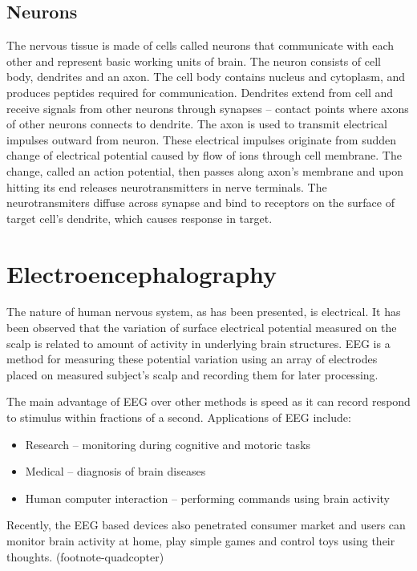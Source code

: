 \subsection{Neurons}
The nervous tissue is made of cells called neurons that communicate with each
other and represent basic working units of brain. The neuron consists of cell
body, dendrites and an axon. The cell body contains nucleus and cytoplasm, and
produces peptides required for communication. Dendrites extend from cell and
receive signals from other neurons through synapses -- contact points where
axons of other neurons connects to dendrite. The axon is used to transmit
electrical impulses outward from neuron. These electrical impulses originate
from sudden change of electrical potential caused by flow of ions through cell
membrane. The change, called an action potential, then passes along axon's
membrane and upon hitting its end releases neurotransmitters in nerve terminals.
The neurotransmiters diffuse across synapse and bind to receptors on the surface
of target cell's dendrite, which causes response in target.\cite{brainFacts}


\section{Electroencephalography}
The nature of human nervous system, as has been presented, is electrical. It has
been observed that the variation of surface electrical potential measured on the
scalp is related to amount of activity in underlying brain structures. EEG is a
method for measuring these potential variation using an array of electrodes
placed on measured subject's scalp and recording them for later processing.
\cite{eegClass}

The main advantage of EEG over other methods is speed as it can record respond
to stimulus within fractions of a second. \cite{eegFund} Applications of EEG
include:
\begin{itemize}
  \item Research -- monitoring during cognitive and motoric tasks
  \item Medical -- diagnosis of brain diseases
  \item Human computer interaction -- performing commands using brain activity  
\end{itemize}
Recently, the EEG based devices also penetrated consumer market and users can
monitor brain activity at home, play simple games and control toys using
their thoughts. (footnote-quadcopter)

